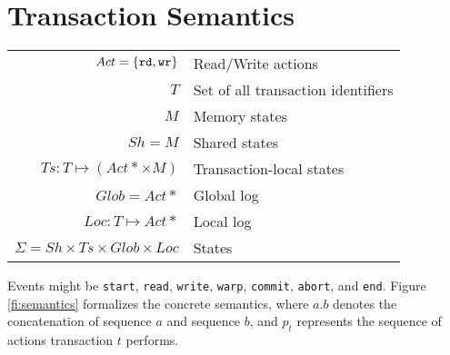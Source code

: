 \section{Transaction Semantics}

\begin{tabular}{rl}
	$Act = \{{\tt rd}, {\tt wr}\}$ & Read/Write actions \\
	$T$ & Set of all transaction identifiers\\
	$M$ & Memory states\\
	$Sh = M$ & Shared states\\
	$Ts : T \mapsto (Act* \times M)$ & Transaction-local states\\
	$Glob = Act*$ & Global log\\
	$Loc : T \mapsto Act*$ & Local log\\
	$ \Sigma = Sh \times Ts \times Glob \times Loc$ & States\\
\end{tabular}

Events might be {\tt start}, {\tt read}, {\tt write}, {\tt warp}, {\tt commit}, {\tt abort}, and {\tt end}. Figure \ref{fi:semantics} formalizes the concrete semantics, where $a.b$ denotes the concatenation of sequence $a$ and sequence $b$, and $p_t$ represents the sequence of actions transaction $t$ performs.

